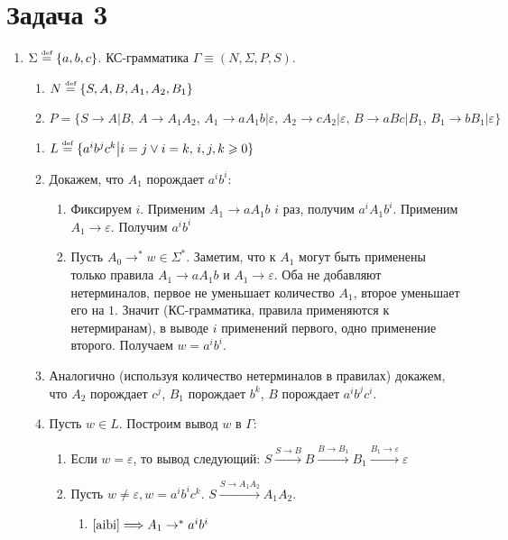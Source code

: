 \documentclass[a4paper]{article}
\def\eqdef{\overset{\mbox{\tiny def}}{=}}
\begin{document}
\section*{Задача 3}
\begin{enumerate}
\item $\Sigma\eqdef\{a,b,c\}$. КС-грамматика $\Gamma\equiv(N,\Sigma,P,S)$.\begin{enumerate}
\item $N\eqdef\{S,A,B,A_1,A_2,B_1\}$
\item $P=\{S\longrightarrow A|B,\,A\longrightarrow A_1A_2,\,A_1\longrightarrow aA_1b|\varepsilon,\,A_2\longrightarrow cA_2|\varepsilon,\,B\longrightarrow aBc|B_1,\,B_1\longrightarrow bB_1|\varepsilon\}$
\end{enumerate}
\begin{enumerate}[1.]
\item $L\eqdef\{a^ib^jc^k\big|i=j\vee i=k,\,i,j,k\geqslant 0\}$
\item \label{aibi} Докажем, что $A_1$ порождает $a^ib^i$:\begin{enumerate}
\item Фиксируем $i$. Применим $A_1\longrightarrow aA_1b$ $i$ раз, получим $a^iA_1b^i$. Применим $A_1\longrightarrow\varepsilon$. Получим $a^ib^i$
\item Пусть $A_0\longrightarrow^*w\in \Sigma^*$. Заметим, что к $A_1$ могут быть применены только правила $A_1\longrightarrow aA_1b$ и $A_1\longrightarrow\varepsilon$. Оба не добавляют нетерминалов, первое не уменьшает количество $A_1$, второе уменьшает его на $1$. Значит (КС-грамматика, правила применяются к нетермиранам), в выводе $i$ применений первого, одно применение второго. Получаем $w=a^ib^i$.
\end{enumerate}
\item \label {same} Аналогично (используя количество нетерминалов в правилах) докажем, что $A_2$ порождает $c^j$, $B_1$ порождает $b^k$, $B$ порождает $a^ib^jc^i$.
\item Пусть $w\in L$. Построим вывод $w$ в $\Gamma$:\begin{enumerate}
\item Если $w=\varepsilon$, то вывод следующий: $S\overset{S\rightarrow B}{\longrightarrow} B\overset{B\rightarrow B_1}{\longrightarrow} B_1\overset{B_1\rightarrow\varepsilon}{\longrightarrow} \varepsilon$
\item Пусть $w\neq\varepsilon, w=a^ib^ic^k$. $S\overset{S\rightarrow A_1A_2}{\longrightarrow}A_1A_2$.\begin{enumerate}
\item $\ref{aibi}\Longrightarrow A_1\rightarrow^* a^ib^i$

\end{enumerate}
\end{enumerate}
\end{enumerate}
\end{enumerate}
\end{document}
